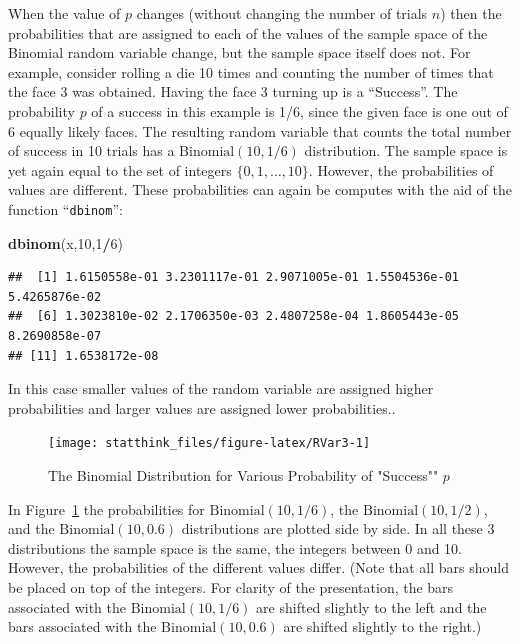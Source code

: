 \documentclass[]{krantz}
\makeatletter
\newenvironment{Shaded}{\begin{snugshade}}{\end{snugshade}}
\newcommand{\DecValTok}[1]{\textcolor[rgb]{0.00,0.00,0.81}{#1}}
\newcommand{\KeywordTok}[1]{\textcolor[rgb]{0.13,0.29,0.53}{\textbf{#1}}}
\newcommand{\NormalTok}[1]{#1}
\newcommand{\OperatorTok}[1]{\textcolor[rgb]{0.81,0.36,0.00}{\textbf{#1}}}
\newenvironment{kframe}{%
\medskip{}
\setlength{\fboxsep}{.8em}
 \def\at@end@of@kframe{}%
 \ifinner\ifhmode%
  \def\at@end@of@kframe{\end{minipage}}%
  \begin{minipage}{\columnwidth}%
 \fi\fi%
 \def\FrameCommand##1{\hskip\@totalleftmargin \hskip-\fboxsep
 \colorbox{shadecolor}{##1}\hskip-\fboxsep
     \hskip-\linewidth \hskip-\@totalleftmargin \hskip\columnwidth}%
 \MakeFramed {\advance\hsize-\width
   \@totalleftmargin\z@ \linewidth\hsize
   \@setminipage}}%
 {\par\unskip\endMakeFramed%
 \at@end@of@kframe}
\renewenvironment{Shaded}{\begin{kframe}}{\end{kframe}}
\theoremstyle{definition}
\theoremstyle{definition}
\theoremstyle{definition}
\theoremstyle{remark}
\makeatother
\begin{document}
When the value of \(p\) changes (without changing the number of trials
\(n\)) then the probabilities that are assigned to each of the values of
the sample space of the Binomial random variable change, but the sample
space itself does not. For example, consider rolling a die 10 times and
counting the number of times that the face 3 was obtained. Having the
face 3 turning up is a ``Success''. The probability \(p\) of a success in
this example is 1/6, since the given face is one out of 6 equally likely
faces. The resulting random variable that counts the total number of
success in 10 trials has a \(\mathrm{Binomial}(10,1/6)\) distribution. The
sample space is yet again equal to the set of integers
\(\{0,1, \ldots,10\}\). However, the probabilities of values are
different. These probabilities can again be computes with the aid of the
function ``\texttt{dbinom}'':

\begin{Shaded}
\begin{Highlighting}[]
\KeywordTok{dbinom}\NormalTok{(x,}\DecValTok{10}\NormalTok{,}\DecValTok{1}\OperatorTok{/}\DecValTok{6}\NormalTok{)}
\end{Highlighting}
\end{Shaded}

\begin{verbatim}
##  [1] 1.6150558e-01 3.2301117e-01 2.9071005e-01 1.5504536e-01 5.4265876e-02
##  [6] 1.3023810e-02 2.1706350e-03 2.4807258e-04 1.8605443e-05 8.2690858e-07
## [11] 1.6538172e-08
\end{verbatim}

In this case smaller values of the random variable are assigned higher
probabilities and larger values are assigned lower probabilities..

\begin{figure}

{\centering \texttt{[image: statthink\_files/figure-latex/RVar3-1]} 

}

\caption{The Binomial Distribution for Various Probability of "Success"" $p$}\label{fig:RVar3}
\end{figure}

In Figure~\ref{fig:RVar3} the probabilities for
\(\mathrm{Binomial}(10,1/6)\), the \(\mathrm{Binomial}(10,1/2)\), and the
\(\mathrm{Binomial}(10,0.6)\) distributions are plotted side by side. In
all these 3 distributions the sample space is the same, the integers
between 0 and 10. However, the probabilities of the different values
differ. (Note that all bars should be placed on top of the integers. For
clarity of the presentation, the bars associated with the
\(\mathrm{Binomial}(10,1/6)\) are shifted slightly to the left and the
bars associated with the \(\mathrm{Binomial}(10,0.6)\) are shifted
slightly to the right.)
\end{document}
